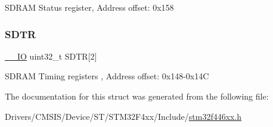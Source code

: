 S\+D\+R\+AM Status register, Address offset\+: 0x158 \mbox{\label{struct_f_m_c___bank5__6___type_def_a72abf9d6af975f890224d6856bbba96c}} 
\subsubsection{\texorpdfstring{S\+D\+TR}{SDTR}}
{\footnotesize\ttfamily \mbox{\hyperlink{core__sc300_8h_aec43007d9998a0a0e01faede4133d6be}{\+\_\+\+\_\+\+IO}} uint32\+\_\+t S\+D\+TR\mbox{[}2\mbox{]}}

S\+D\+R\+AM Timing registers , Address offset\+: 0x148-\/0x14C 

The documentation for this struct was generated from the following file\+:\begin{DoxyCompactItemize}
\item 
Drivers/\+C\+M\+S\+I\+S/\+Device/\+S\+T/\+S\+T\+M32\+F4xx/\+Include/\mbox{\hyperlink{stm32f446xx_8h}{stm32f446xx.\+h}}\end{DoxyCompactItemize}
